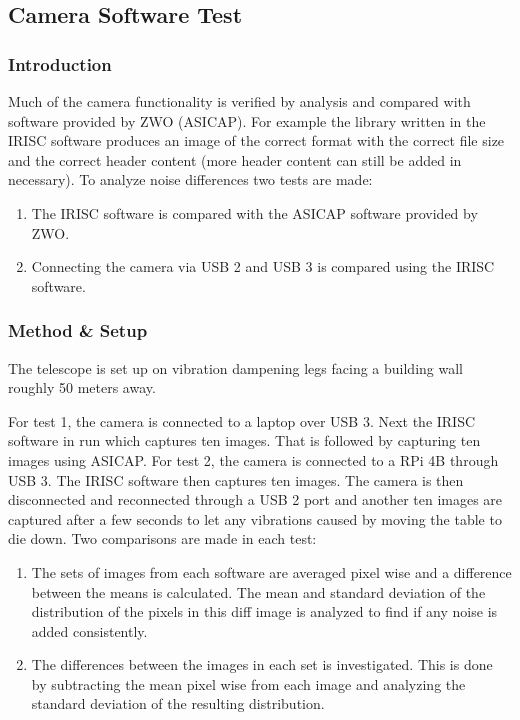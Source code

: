 \subsection{Camera Software Test}
\label{app:camera_software_test}
\subsubsection*{Introduction}

Much of the camera functionality is verified by analysis and compared with software provided by ZWO (ASICAP). For example the library written in the IRISC software produces an image of the correct format with the correct file size and the correct header content (more header content can still be added in necessary). To analyze noise differences two tests are made:

\begin{enumerate}
    \item The IRISC software is compared with the ASICAP software provided by ZWO.
    \item Connecting the camera via USB 2 and USB 3 is compared using the IRISC software.
\end{enumerate}

\subsubsection*{Method \& Setup}

The telescope is set up on vibration dampening legs facing a building wall roughly 50 meters away.

For test 1, the camera is connected to a laptop over USB 3. Next the IRISC software in run which captures ten images. That is followed by capturing ten images using ASICAP.  For test 2, the camera is connected to a RPi 4B through USB 3. The IRISC software then captures ten images. The camera is then disconnected and reconnected through a USB 2 port and another ten images are captured after a few seconds to let any vibrations caused by moving the table to die down. Two comparisons are made in each test:

\begin{enumerate}
    \item The sets of images from each software are averaged pixel wise and a difference between the means is calculated. The mean and standard deviation of the distribution of the pixels in this diff image is analyzed to find if any noise is added consistently. 

    \item The differences between the images in each set is investigated.  This is done by subtracting the mean pixel wise from each image and analyzing the standard deviation of the resulting distribution.
\end{enumerate}

